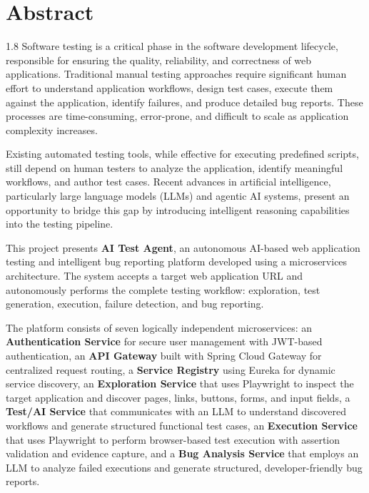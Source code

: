 \chapter*{Abstract}

\begin{spacing}{1.8}
Software testing is a critical phase in the software development lifecycle, responsible for ensuring the quality, reliability, and correctness of web applications. Traditional manual testing approaches require significant human effort to understand application workflows, design test cases, execute them against the application, identify failures, and produce detailed bug reports. These processes are time-consuming, error-prone, and difficult to scale as application complexity increases.

Existing automated testing tools, while effective for executing predefined scripts, still depend on human testers to analyze the application, identify meaningful workflows, and author test cases. Recent advances in artificial intelligence, particularly large language models (LLMs) and agentic AI systems, present an opportunity to bridge this gap by introducing intelligent reasoning capabilities into the testing pipeline.

This project presents \textbf{AI Test Agent}, an autonomous AI-based web application testing and intelligent bug reporting platform developed using a microservices architecture. The system accepts a target web application URL and autonomously performs the complete testing workflow: exploration, test generation, execution, failure detection, and bug reporting.

The platform consists of seven logically independent microservices: an \textbf{Authentication Service} for secure user management with JWT-based authentication, an \textbf{API Gateway} built with Spring Cloud Gateway for centralized request routing, a \textbf{Service Registry} using Eureka for dynamic service discovery, an \textbf{Exploration Service} that uses Playwright to inspect the target application and discover pages, links, buttons, forms, and input fields, a \textbf{Test/AI Service} that communicates with an LLM to understand discovered workflows and generate structured functional test cases, an \textbf{Execution Service} that uses Playwright to perform browser-based test execution with assertion validation and evidence capture, and a \textbf{Bug Analysis Service} that employs an LLM to analyze failed executions and generate structured, developer-friendly bug reports.


\end{spacing}
